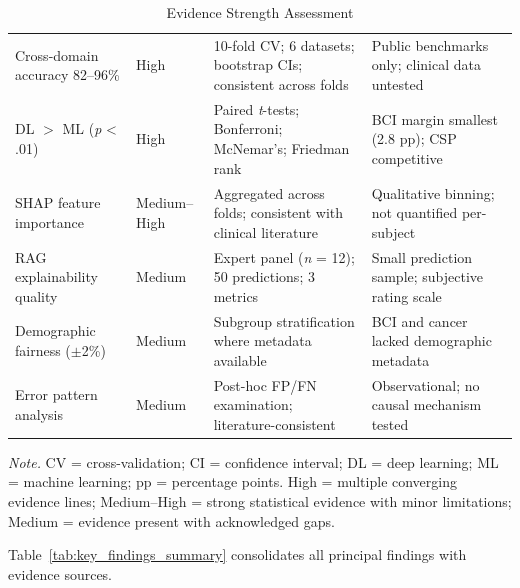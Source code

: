 \begin{table}[H]
\tablestripes
\begin{tabularx}{\textwidth}{L L L L}
\toprule
{} &  &  &  \\
\midrule
Cross-domain accuracy 82--96\% & High & 10-fold CV; 6 datasets; bootstrap CIs; consistent across folds & Public benchmarks only; clinical data untested \\
\addlinespace
DL $>$ ML (\textit{p} < .01) & High & Paired \textit{t}-tests; Bonferroni; McNemar's; Friedman rank & BCI margin smallest (2.8 pp); CSP competitive \\
\addlinespace
SHAP feature importance & Medium--High & Aggregated across folds; consistent with clinical literature & Qualitative binning; not quantified per-subject \\
\addlinespace
RAG explainability quality & Medium & Expert panel (\textit{n} = 12); 50 predictions; 3 metrics & Small prediction sample; subjective rating scale \\
\addlinespace
Demographic fairness ($\pm$2\%) & Medium & Subgroup stratification where metadata available & BCI and cancer lacked demographic metadata \\
\addlinespace
Error pattern analysis & Medium & Post-hoc FP/FN examination; literature-consistent & Observational; no causal mechanism tested \\
\bottomrule
\end{tabularx}
\caption{Evidence Strength Assessment}
\label{tab:evidence_strength}
\vspace{0.5em}\noindent\textit{Note.} CV = cross-validation; CI = confidence interval; DL = deep learning; ML = machine learning; pp = percentage points. High = multiple converging evidence lines; Medium--High = strong statistical evidence with minor limitations; Medium = evidence present with acknowledged gaps.
\end{table}

Table~\ref{tab:key_findings_summary} consolidates all principal findings with evidence sources.

